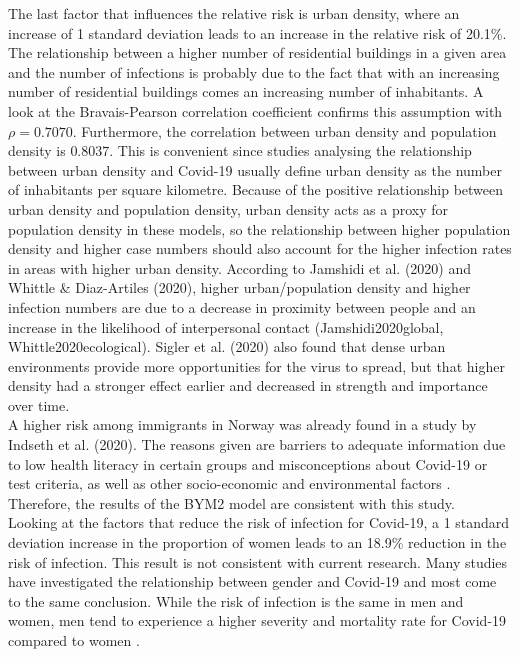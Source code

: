 The last factor that influences the relative risk is urban density, where an increase of 1 standard deviation leads to an increase in the relative risk of 20.1\%. The relationship between a higher number of residential buildings in a given area and the number of infections is probably due to the fact that with an increasing number of residential buildings comes an increasing number of inhabitants. A look at the Bravais-Pearson correlation coefficient confirms this assumption with $\rho=0.7070$. Furthermore, the correlation between urban density and population density is $0.8037$. This is convenient since studies analysing the relationship between urban density and Covid-19 usually define urban density as the number of inhabitants per square kilometre. Because of the positive relationship between urban density and population density, urban density acts as a proxy for population density in these models, so the relationship between higher population density and higher case numbers should also account for the higher infection rates in areas with higher urban density. According to Jamshidi et al. (2020) and Whittle \& Diaz-Artiles (2020), higher urban/population density and higher infection numbers are due to a decrease in proximity between people and an increase in the likelihood of interpersonal contact (Jamshidi2020global, Whittle2020ecological). Sigler et al. (2020) also found that dense urban environments provide more opportunities for the virus to spread, but that higher density had a stronger effect earlier and decreased in strength and importance over time\autocite[][]{sigler2020socio}. \\
A higher risk among immigrants in Norway was already found in a study by Indseth et al. (2020). The reasons given are barriers to adequate information due to low health literacy in certain groups and misconceptions about Covid-19 or test criteria, as well as other socio-economic and environmental factors \autocite[][]{indseth2020covid}. Therefore, the results of the BYM2 model are consistent with this study. \\
Looking at the factors that reduce the risk of infection for Covid-19, a 1 standard deviation increase in the proportion of women leads to an 18.9\% reduction in the risk of infection. This result is not consistent with current research.  Many studies have investigated the relationship between gender and Covid-19 and most come to the same conclusion. While the risk of infection is the same in men and women, men tend to experience a higher severity and mortality rate for Covid-19 compared to women \autocite[][]{mukherjee2021covid, gausman2020sex, spagnolo2020sex, kopel2020racial}. \\
